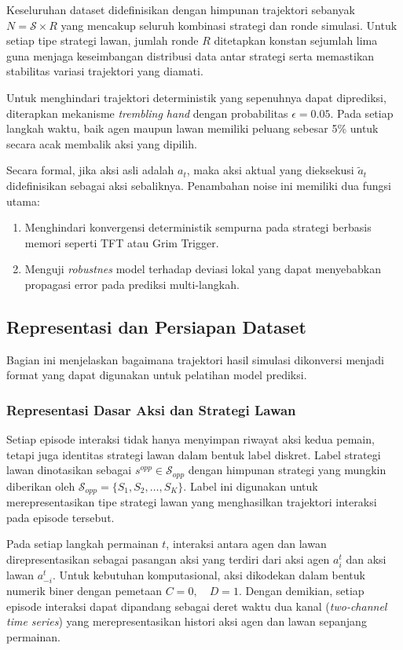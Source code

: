 Keseluruhan dataset didefinisikan dengan himpunan trajektori sebanyak $N = \mathcal{S} \times R$ yang mencakup seluruh kombinasi strategi dan ronde simulasi. Untuk setiap tipe strategi lawan, jumlah ronde $R$ ditetapkan konstan sejumlah lima guna menjaga keseimbangan distribusi data antar strategi serta memastikan stabilitas variasi trajektori yang diamati.

Untuk menghindari trajektori deterministik yang sepenuhnya dapat diprediksi, diterapkan mekanisme \textit{trembling hand} dengan probabilitas $\epsilon = 0.05$. Pada setiap langkah waktu, baik agen maupun lawan memiliki peluang sebesar 5\% untuk secara acak membalik aksi yang dipilih.

Secara formal, jika aksi asli adalah $a_t$, maka aksi aktual yang dieksekusi $\tilde{a}_t$ didefinisikan sebagai aksi sebaliknya. Penambahan noise ini memiliki dua fungsi utama:
\begin{enumerate}
    \item Menghindari konvergensi deterministik sempurna pada strategi berbasis memori seperti TFT atau Grim Trigger.
    \item Menguji \textit{robustnes} model terhadap deviasi lokal yang dapat menyebabkan propagasi error pada prediksi multi-langkah.
\end{enumerate}

\subsection{Representasi dan Persiapan Dataset}

Bagian ini menjelaskan bagaimana trajektori hasil simulasi dikonversi menjadi format yang dapat digunakan untuk pelatihan model prediksi.

\subsubsection{Representasi Dasar Aksi dan Strategi Lawan}

Setiap episode interaksi tidak hanya menyimpan riwayat aksi kedua pemain, tetapi juga identitas strategi lawan dalam bentuk label diskret. Label strategi lawan dinotasikan sebagai $s^{opp} \in \mathcal{S}_{opp}$ dengan himpunan strategi yang mungkin diberikan oleh $\mathcal{S}_{opp} = \{S_1, S_2, \dots, S_K\}.$ Label ini digunakan untuk merepresentasikan tipe strategi lawan yang menghasilkan trajektori interaksi pada episode tersebut.

Pada setiap langkah permainan $t$, interaksi antara agen dan lawan direpresentasikan sebagai pasangan aksi yang terdiri dari aksi agen $a_i^t$ dan aksi lawan $a_{-i}^t$. Untuk kebutuhan komputasional, aksi dikodekan dalam bentuk numerik biner dengan pemetaan $C = 0, \quad D = 1.$ Dengan demikian, setiap episode interaksi dapat dipandang sebagai deret waktu dua kanal (\textit{two-channel time series}) yang merepresentasikan histori aksi agen dan lawan sepanjang permainan.

